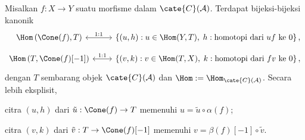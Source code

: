 \begin{proposisi}\label{prop:homotopy-kernel-cokernel}
	Misalkan $f:X\to Y$ suatu morfisme dalam $\cate{C}(\mathcal{A})$. Terdapat
	bijeksi-bijeksi kanonik
	\[\begin{tikzcd}[row sep=small]
		\Hom\left( \Cone(f), T \right) \arrow[leftrightarrow, r, "1:1"] & \left\{ (u, h): u \in \Hom(Y,T), \; h: \text{homotopi dari $uf$ ke $0$} \right\}, \\
		\Hom\left( T, \Cone(f)[-1] \right) \arrow[leftrightarrow, r, "1:1"] & \left\{ (v, k): v \in \Hom(T,X), \; k: \text{homotopi dari $fv$ ke $0$} \right\},
	\end{tikzcd}\]
	dengan $T$ sembarang objek $\cate{C}(\mathcal{A})$ dan
	$\Hom:=\Hom_{\cate{C}(\mathcal{A})}$. Secara lebih eksplisit,
	\begin{compactitem}
		\item citra $(u,h)$ dari $\tilde{u}:\Cone(f)\to T$ memenuhi
		$u=\tilde{u}\circ\alpha(f)$;
		\item citra $(v,k)$ dari $\tilde{v}:T\to\Cone(f)[-1]$ memenuhi
		$v=\beta(f)[-1]\circ\tilde{v}$.
	\end{compactitem}
\end{proposisi}
